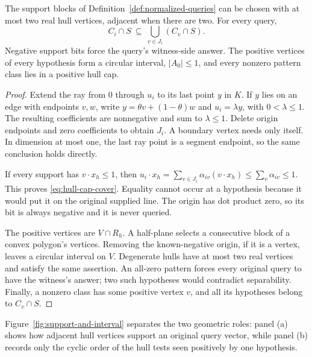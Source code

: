 \begin{lemma}\label{lem:hull-structure}
The support blocks of Definition~\ref{def:normalized-queries} can
be chosen with at most two real hull vertices, adjacent when there
are two. For every query,
\begin{equation}\label{eq:hull-cap-cover}
 C_i\cap S\ \subseteq\ \bigcup_{v\in J_i}(C_v\cap S).
\end{equation}
Negative support bits force the query's witness-side answer.
The positive vertices of every hypothesis form a circular interval,
$|A_0|\le1$, and every nonzero pattern class lies in a positive hull cap.
\end{lemma}
\begin{proof}
Extend the ray from $0$ through $u_i$ to its last point $y$ in $K$.
If $y$ lies on an edge with endpoints $v,w$, write
$y=\theta v+(1-\theta)w$ and $u_i=\lambda y$, with
$0<\lambda\le1$. The resulting coefficients are nonnegative and
sum to $\lambda\le1$. Delete origin endpoints and zero coefficients
to obtain $J_i$. A boundary vertex needs only itself.
In dimension at most one, the last ray point is a segment endpoint,
so the same conclusion holds directly.

If every support has $v\cdot x_h\le1$, then
$u_i\cdot x_h=\sum_{v\in J_i}\alpha_{iv}(v\cdot x_h)
\le\sum_v\alpha_{iv}\le1$. This proves
\eqref{eq:hull-cap-cover}. Equality cannot occur at a hypothesis
because it would put it on the original supplied line.
The origin has dot product zero, so its bit is always negative
and it is never queried.

The positive vertices are $V\cap R_h$.
A half-plane selects a consecutive block of a convex polygon's
vertices. Removing the known-negative origin, if it is a vertex,
leaves a circular interval on $V$. Degenerate hulls have at most
two real vertices and satisfy the same assertion.
An all-zero pattern forces every original query to have the
witness's answer; two such hypotheses would contradict separability.
Finally, a nonzero class has some positive vertex $v$, and all
its hypotheses belong to $C_v\cap S$.
\end{proof}



Figure~\ref{fig:support-and-interval} separates the two geometric
roles: panel (a) shows how adjacent hull vertices support an original
query vector, while panel (b) records only the cyclic order of the
hull tests seen positively by one hypothesis.

